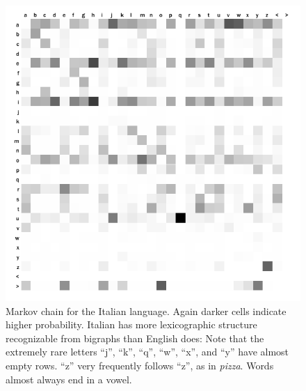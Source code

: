\documentclass[twocolumn]{article}
\begin{document}
\begin{figure}[t]
\includegraphics[width=\linewidth]{italiancoin1}
\caption{Markov chain for the Italian language. Again darker cells
  indicate higher probability. Italian has more lexicographic
  structure recognizable from bigraphs than English does: Note that
  the extremely rare letters ``j'', ``k'', ``q'', ``w'', ``x'', and
  ``y'' have almost empty rows. ``z'' very frequently follows ``z'',
  as in {\it pizza}. Words almost always end in a vowel.}
\label{fig:italianbigrams}
\end{figure}
\end{document}
